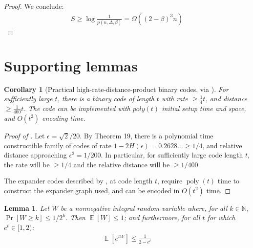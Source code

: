 \documentclass[10pt]{article}
\newtheorem{lemma}[theorem]{Lemma}
\newtheorem{corollary}[lemma]{Corollary}
\theoremstyle{definition}\newtheorem{definition}[lemma]{Definition}
\theoremstyle{remark}  \newtheorem*{remark}{Remark}
\DeclareMathOperator{\EE}{\mathbb{E}}
\newcommand{\NN}{\mathbb{N}}
\DeclareMathOperator{\poly}{poly}
\begin{document}
\begin{proof}
  We conclude:
  \begin{align*}
    S \ge \log \frac{1}{p(n, \Delta, \beta)} = \Omega((2-\beta)^3 n)
  \end{align*}
\end{proof}
\section{Supporting lemmas}


\begin{corollary}[Practical high-rate-distance-product binary codes, via \cite{SipserS96}]\label{cor:practical-binary-codes}
  For sufficiently large $t$, there is a binary code
  of length $t$ with rate $\ge \frac{1}{4} t$, and distance $\ge \frac{1}{400} t$. The code can be implemented with
  $poly(t)$ initial setup time and space, and $O(t^2)$ encoding time.
  
\end{corollary}

\begin{proof}[Proof of ]
  Let $\epsilon = \sqrt{2}/20$. By \cite{SipserS96} Theorem 19, there is a polynomial time constructible family of codes of rate $1 - 2 H(\epsilon) = 0.2628\ldots \ge 1/4$, and relative distance approaching $\epsilon^2 = 1/200$. In particular, for sufficiently large code length $t$, the rate will be $\ge 1/4$ and the relative distance will be $\ge 1/400$.
  
  The expander codes described by \cite{SipserS96}, at code length $t$, require $\poly(t)$ time to construct the expander graph used, and can
  be encoded in $O(t^2)$ time.
\end{proof}

\begin{lemma}\label{lem:moment-gen-func}
   Let $W$ be a nonnegative integral random variable where, for all $k \in \NN$, $\Pr[W \ge k] \le 1/2^k$. Then $\EE[W] \le 1$; and furthermore, for all $t$ for which $e^t \in [1,2)$:
   \begin{align*}
        \EE[e^{t W}] \le \frac{1}{2 - e^t}
   \end{align*}
\end{lemma}
\end{document}
